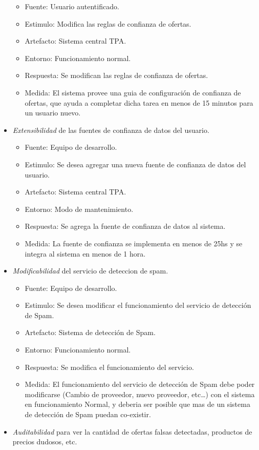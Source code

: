 \begin{itemize}
  \begin{itemize}
  \item
    Fuente: Usuario autentificado.
  \item
    Estimulo: Modifica las reglas de confianza de ofertas.
  \item
    Artefacto: Sistema central TPA.
  \item
    Entorno: Funcionamiento normal.
  \item
    Respuesta: Se modifican las reglas de confianza de ofertas.
  \item
    Medida: El sistema provee una guia de configuración de confianza de
    ofertas, que ayuda a completar dicha tarea en menos de 15 minutos
    para un usuario nuevo.
  \end{itemize}
\item
  \emph{Extensibilidad} de las fuentes de confianza de datos del
  usuario.

  \begin{itemize}
  \item
    Fuente: Equipo de desarrollo.
  \item
    Estimulo: Se desea agregar una nueva fuente de confianza de datos
    del usuario.
  \item
    Artefacto: Sistema central TPA.
  \item
    Entorno: Modo de mantenimiento.
  \item
    Respuesta: Se agrega la fuente de confianza de datos al sistema.
  \item
    Medida: La fuente de confianza se implementa en menos de 25hs y se
    integra al sistema en menos de 1 hora.
  \end{itemize}
\item
  \emph{Modificabilidad} del servicio de deteccion de spam.

  \begin{itemize}
  \item
    Fuente: Equipo de desarrollo.
  \item
    Estimulo: Se desea modificar el funcionamiento del servicio de
    detección de Spam.
  \item
    Artefacto: Sistema de detección de Spam.
  \item
    Entorno: Funcionamiento normal.
  \item
    Respuesta: Se modifica el funcionamiento del servicio.
  \item
    Medida: El funcionamiento del servicio de detección de Spam debe
    poder modificarse (Cambio de proveedor, nuevo proveedor,
    etc\ldots{}) con el sistema en funcionamiento Normal, y deberia ser
    posible que mas de un sistema de detección de Spam puedan
    co-existir.
  \end{itemize}
\item
  \emph{Auditabilidad} para ver la cantidad de ofertas falsas
  detectadas, productos de precios dudosos, etc.


\end{itemize}
